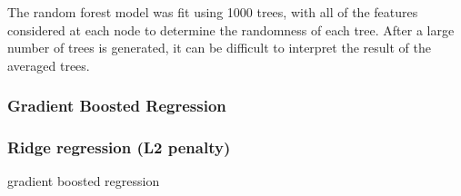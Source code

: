 \documentclass[sigconf]{acmart}
\begin{document}
The random forest model was fit using 1000 trees, with all of the features 
considered at each node to determine the randomness of each tree. After a 
large number of trees is generated, it can be difficult to interpret the result 
of the averaged trees. 


\subsubsection{Gradient Boosted Regression} 




\subsubsection{Ridge regression (L2 penalty)} 
gradient boosted regression






 
 
\end{document}
